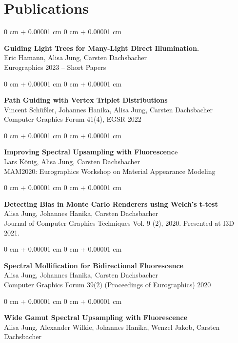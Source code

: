 \documentclass[10pt, letterpaper]{article}
\newenvironment{onecolentry}{
    \begin{adjustwidth}{
        0 cm + 0.00001 cm
    }{
        0 cm + 0.00001 cm
    }
}{
    \end{adjustwidth}
} %
\begin{document}
\newcommand{\vspacepubl}{\expspace}    
    \section{Publications}
    \sectspacetop
            \begin{samepage}
    \begin{onecolentry}
\textbf{Guiding Light Trees for Many-Light Direct Illumination.}\\
Eric Hamann, Alisa Jung, Carsten Dachsbacher\\
Eurographics 2023 – Short Papers
        \end{onecolentry}
\vspacepubl
    \begin{onecolentry}
    \textbf{Path Guiding with Vertex Triplet Distributions}\\
Vincent Schüßler, Johannes Hanika, Alisa Jung, Carsten Dachsbacher\\
Computer Graphics Forum 41(4), EGSR 2022
    \end{onecolentry}
\vspacepubl
    \begin{onecolentry}
    \textbf{Improving Spectral Upsampling with Fluorescenc}e\\
Lars König, Alisa Jung, Carsten Dachsbacher\\
MAM2020: Eurographics Workshop on Material Appearance Modeling
    \end{onecolentry}
\vspacepubl
    \begin{onecolentry}
\textbf{Detecting Bias in Monte Carlo Renderers using Welch’s t-test}\\
Alisa Jung, Johannes Hanika, Carsten Dachsbacher\\
Journal of Computer Graphics Techniques Vol. 9 (2), 2020. Presented at I3D 2021.    
    \end{onecolentry}
\vspacepubl
    \begin{onecolentry}
\textbf{Spectral Mollification for Bidirectional Fluorescence}\\
Alisa Jung, Johannes Hanika, Carsten Dachsbacher\\
Computer Graphics Forum 39(2) (Proceedings of Eurographics) 2020
    \end{onecolentry}
\vspacepubl
    \begin{onecolentry}
\textbf{Wide Gamut Spectral Upsampling with Fluorescence}\\
Alisa Jung, Alexander Wilkie, Johannes Hanika, Wenzel Jakob, Carsten Dachsbacher\\

\end{onecolentry}
\end{samepage}
\end{document}
